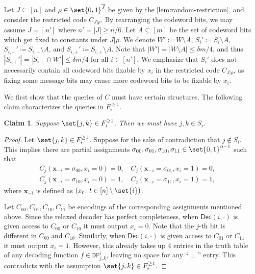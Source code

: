 \documentclass[10pt,a4paper]{article}
\newtheorem{claim}{Claim}
\theoremstyle{remark}
\newcommand{\tuple}[1]{\ensuremath{\left(#1\right)}}
\newcommand{\tp}{\tuple}
\def\*#1{\mathbf{#1}}
\newcommand{\Dec}{\ensuremath{\mathsf{Dec}}\xspace}
\begin{document}
Let $J \subseteq [n]$ and $\rho \in \set{0,1}^{\overline{J}}$ be given by the \cref{lem:random-restriction}, and consider the restricted code $C_{J|\rho}$. By rearranging the codeword bits, we may assume $J=[n']$ where $n'=|J| \ge n/6$. 
Let $A \subseteq [m]$ be the set of codeword bits which get fixed to constants under $J|\rho$. We denote $W'\coloneqq W\setminus A$, $S_i'\coloneqq S_i \setminus A$, $S_{i,-}'\coloneqq S_{i,-}\setminus A$, and $S_{i,+}'\coloneqq S_{i,+}\setminus A$. Note that $|W'|=|W\setminus A| \le \delta m/4$, and thus $|S_{i,+}'|=|S_{i,+}\cap W'|\le \delta m/4$ for all $i \in [n']$. We emphasize that $S_i'$ does not necessarily contain all codeword bits fixable by $x_i$ in the restricted code $C_{J|\rho}$, as fixing some message bits may cause more codeword bits to be fixable by $x_i$.

We first show that the queries of $C$ must have certain structures. The following claim characterizes the queries in $F_i^{\ge 1}$.
\begin{claim} \label{clm:bot-fix}
	Suppose $\set{j,k} \in F_{i}^{\ge 1}$. Then we must have $j,k \in S_i$.
\end{claim}
\begin{proof}
	Let $\set{j, k} \in F_{i}^{\ge 1}$. Suppose for the sake of contradiction that $j \notin S_i$. This implies there are partial assignments $\sigma_{00}, \sigma_{01}, \sigma_{10}, \sigma_{11} \in \set{0,1}^{n-1}$ such that 
	\begin{align*}
	C_j\tp{\*x_{-i} = \sigma_{00}, x_i = 0} = 0, \quad C_j\tp{\*x_{-i} = \sigma_{01}, x_i = 1} = 0, \\
	C_j\tp{\*x_{-i} = \sigma_{10}, x_i = 0} = 1, \quad C_j\tp{\*x_{-i} = \sigma_{11}, x_i = 1} = 1,
	\end{align*}
	where $\*x_{-i}$ is defined as $\tp{x_t \colon t \in [n]\setminus\set{i}}$.
	
	Let $C_{00}, C_{01}, C_{10}, C_{11}$ be encodings of the corresponding assignments mentioned above. Since the relaxed decoder has perfect completeness, when $\Dec(i,\cdot)$ is given access to $C_{00}$ or $C_{10}$  it must output $x_i=0$. Note that the $j$-th bit is different in $C_{00}$ and $C_{10}$. Similarly, when $\Dec(i,\cdot)$ is given access to $C_{01}$ or $C_{11}$ it must output $x_i = 1$. However, this already takes up 4 entries  in the truth table of any decoding function $f \in \mathtt{DF}_{j,k}^i$, leaving no space for any ``$\perp$'' entry. This contradicts with the assumption $\set{j,k} \in F_{i}^{\ge 1}$. 
\end{proof}
\end{document}
